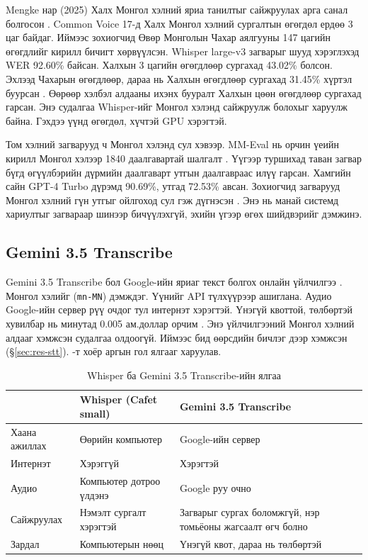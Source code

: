 Mengke нар (2025) Халх Монгол хэлний яриа танилтыг сайжруулах арга санал болгосон \cite{mengke2025khalkha}. Common Voice 17-д Халх Монгол хэлний сургалтын өгөгдөл ердөө 3 цаг байдаг. Иймээс зохиогчид Өвөр Монголын Чахар аялгууны 147 цагийн өгөгдлийг кирилл бичигт хөрвүүлсэн. Whisper large-v3 загварыг шууд хэрэглэхэд WER 92.60\% байсан. Халхын 3 цагийн өгөгдлөөр сургахад 43.02\% болсон. Эхлээд Чахарын өгөгдлөөр, дараа нь Халхын өгөгдлөөр сургахад 31.45\% хүртэл буурсан \cite{mengke2025khalkha}. Өөрөөр хэлбэл алдааны ихэнх бууралт Халхын цөөн өгөгдлөөр сургахад гарсан. Энэ судалгаа Whisper-ийг Монгол хэлэнд сайжруулж болохыг харуулж байна. Гэхдээ үүнд өгөгдөл, хүчтэй \ac{GPU} хэрэгтэй.

Том хэлний загварууд ч Монгол хэлэнд сул хэвээр. MM-Eval нь орчин үеийн кирилл Монгол хэлээр 1840 даалгавартай шалгалт \cite{zhang2024mmeval}. Үүгээр туршихад таван загвар бүгд өгүүлбэрийн дүрмийн даалгаварт утгын даалгавраас илүү гарсан. Хамгийн сайн GPT-4 Turbo дүрэмд 90.69\%, утгад 72.53\% авсан. Зохиогчид загварууд Монгол хэлний гүн утгыг ойлгоход сул гэж дүгнэсэн \cite{zhang2024mmeval}. Энэ нь манай системд хариултыг загвараар шинээр бичүүлэхгүй, эхийн үгээр өгөх шийдвэрийг дэмжинэ.

\subsection{Gemini 3.5 Transcribe}

Gemini 3.5 Transcribe бол Google-ийн яриаг текст болгох онлайн үйлчилгээ \cite{google_transcribe_model}. Монгол хэлийг (\texttt{mn-MN}) дэмждэг. Үүнийг \ac{API} түлхүүрээр ашиглана. Аудио Google-ийн сервер рүү очдог тул интернэт хэрэгтэй. Үнэгүй квоттой, төлбөртэй хувилбар нь минутад 0.005 ам.доллар орчим \cite{google_pricing}. Энэ үйлчилгээний Монгол хэлний алдааг хэмжсэн судалгаа олдоогүй. Иймээс бид өөрсдийн бичлэг дээр хэмжсэн (§\ref{sec:res-stt}). -т хоёр аргын гол ялгааг харуулав.

\begin{table}[ht]
\centering
\caption{Whisper ба Gemini 3.5 Transcribe-ийн ялгаа}
\label{tab:asr_compare}
\begin{tabular}{|p{3.6cm}|p{5.0cm}|p{5.0cm}|}
\hline
 & \textbf{Whisper (Cafet small)} & \textbf{Gemini 3.5 Transcribe} \\
\hline
Хаана ажиллах & Өөрийн компьютер & Google-ийн сервер \\
\hline
Интернэт & Хэрэггүй & Хэрэгтэй \\
\hline
Аудио & Компьютер дотроо үлдэнэ & Google руу очно \\
\hline
Сайжруулах & Нэмэлт сургалт хэрэгтэй & Загварыг сургах боломжгүй, нэр томьёоны жагсаалт өгч болно \\
\hline
Зардал & Компьютерын нөөц & Үнэгүй квот, дараа нь төлбөртэй \\
\hline
\end{tabular}
\end{table}

